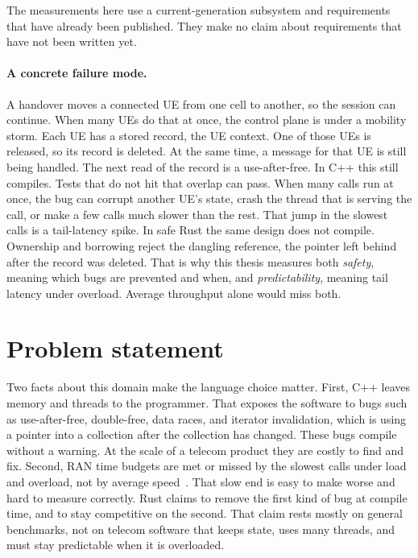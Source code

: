 \documentclass[english,oneside,a4paper,censored,csm,software-track-2020]{HYthesisML}
\begin{document}
The measurements here use a current-generation subsystem and requirements that have already been published.
They make no claim about requirements that have not been written yet.

\paragraph{A concrete failure mode.}
A handover moves a connected UE from one cell to another, so the session can continue.
When many UEs do that at once, the control plane is under a mobility storm.
Each UE has a stored record, the UE context.
One of those UEs is released, so its record is deleted.
At the same time, a message for that UE is still being handled.
The next read of the record is a use-after-free.
In C++ this still compiles.
Tests that do not hit that overlap can pass.
When many calls run at once, the bug can corrupt another UE's state, crash the thread that is serving the call, or make a few calls much slower than the rest.
That jump in the slowest calls is a tail-latency spike.
In safe Rust the same design does not compile.
Ownership and borrowing reject the dangling reference, the pointer left behind after the record was deleted.
That is why this thesis measures both \emph{safety}, meaning which bugs are prevented and when, and \emph{predictability}, meaning tail latency under overload.
Average throughput alone would miss both.

\section{Problem statement}
Two facts about this domain make the language choice matter.
First, C++ leaves memory and threads to the programmer.
That exposes the software to bugs such as use-after-free, double-free, data races, and iterator invalidation, which is using a pointer into a collection after the collection has changed.
These bugs compile without a warning. At the scale of a telecom product they are costly to find and fix.
Second, RAN time budgets are met or missed by the slowest calls under load and overload, not by average speed~\cite{dean2013tail}.
That slow end is easy to make worse and hard to measure correctly.
Rust claims to remove the first kind of bug at compile time, and to stay competitive on the second.
That claim rests mostly on general benchmarks, not on telecom software that keeps state, uses many threads, and must stay predictable when it is overloaded.
\end{document}
